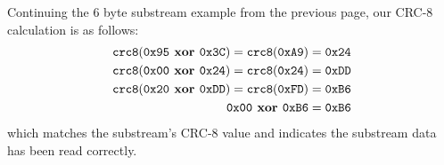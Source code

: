 Continuing the 6 byte substream example from the previous page,
our CRC-8 calculation is as follows:
\begin{align*}
  \texttt{crc8}(\texttt{0x95} \textbf{ xor } \texttt{0x3C}) = \texttt{crc8}(\texttt{0xA9}) &= \texttt{0x24} \\
  \texttt{crc8}(\texttt{0x00} \textbf{ xor } \texttt{0x24}) = \texttt{crc8}(\texttt{0x24}) &= \texttt{0xDD} \\
  \texttt{crc8}(\texttt{0x20} \textbf{ xor } \texttt{0xDD}) = \texttt{crc8}(\texttt{0xFD}) &= \texttt{0xB6} \\
  \texttt{0x00} \textbf{ xor } \texttt{0xB6} &= \texttt{0xB6}
\end{align*}
which matches the substream's CRC-8 value
and indicates the substream data has been read correctly.
